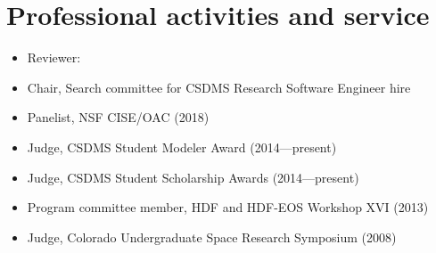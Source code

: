 \section{Professional activities and service}
\vspace{0.5em}

\begin{itemize}

  \item Reviewer:

  \item Chair, Search committee for CSDMS Research Software Engineer hire

  \item Panelist, NSF CISE/OAC (2018)

  \item Judge, CSDMS Student Modeler Award (2014---present)

  \item Judge, CSDMS Student Scholarship Awards (2014---present)

  \item Program committee member, HDF and HDF-EOS Workshop XVI (2013)

  \item Judge, Colorado Undergraduate Space Research Symposium (2008)

\end{itemize}
